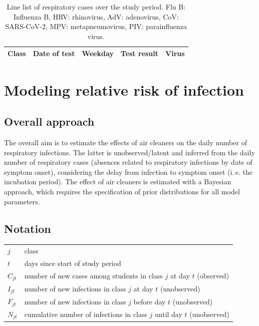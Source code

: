 \documentclass[fleqn,11pt]{wlscirep_supp}
\newcommand\ie{i.\,e.\xspace}
\begin{document}
{\footnotesize\begin{longtable}{l l l l l}
    \caption[Line list of molecular test results over the study period]{Line list of respiratory cases over the study period. Flu B: Influenza B, HRV: rhinovirus, AdV: adenovirus, CoV: SARS-CoV-2, MPV: metapneumovirus, PIV: parainfluenza virus.}\label{tab:mol-data-line-list} \\
    \toprule
    Class & Date of test & Weekday & Test result & Virus \\
    \midrule
    
    \bottomrule
\end{longtable}}

\clearpage

\section{Modeling relative risk of infection}\label{sec:transmission-model}

\subsection{Overall approach}

The overall aim is to estimate the effects of air cleaners on the daily number of respiratory infections. The latter is unobserved/latent and inferred from the daily number of respiratory cases (absences related to respiratory infections by date of symptom onset), considering the delay from infection to symptom onset (\ie the incubation period). The effect of air cleaners is estimated with a Bayesian approach, which requires the specification of prior distributions for all model parameters.


\subsection{Notation}

\begin{tabular}{ll} 
$j$  & class \\
$t$ & days since start of study period \\
$C_{jt}$  & number of  new cases among students in class $j$ at day $t$ (observed) \\
$I_{jt}$  & number of new infections in class $j$ at day $t$ (unobserved)  \\
$F_{jt}$  & number of new infections in class $j$ before day $t$ (unobserved)  \\
$N_{jt}$  & cumulative number of infections in class $j$ until day $t$ (unobserved)  \\
\end{tabular}  
\end{document}
